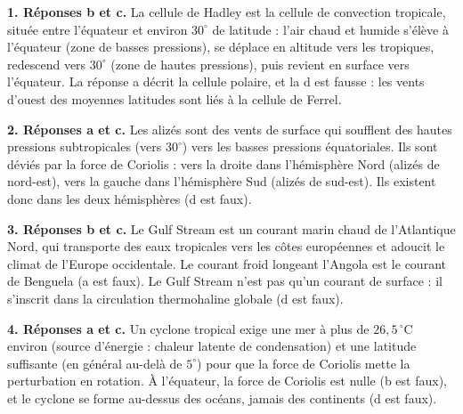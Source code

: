 \documentclass[11pt]{article}
\newcommand{\cle}[1]{{\popxbold\color{popdark}#1}}
\begin{document}
\begin{corrige}
\textbf{1. Réponses b et c.} La cellule de \cle{Hadley} est la cellule de convection tropicale, située entre l'équateur et environ $30^\circ$ de latitude : l'air chaud et humide s'élève à l'équateur (zone de basses pressions), se déplace en altitude vers les tropiques, redescend vers $30^\circ$ (zone de hautes pressions), puis revient en surface vers l'équateur. La réponse a décrit la cellule polaire, et la d est fausse : les vents d'ouest des moyennes latitudes sont liés à la cellule de Ferrel.

\textbf{2. Réponses a et c.} Les \cle{alizés} sont des vents de surface qui soufflent des hautes pressions subtropicales (vers $30^\circ$) vers les basses pressions équatoriales. Ils sont déviés par la \cle{force de Coriolis} : vers la droite dans l'hémisphère Nord (alizés de nord-est), vers la gauche dans l'hémisphère Sud (alizés de sud-est). Ils existent donc dans les deux hémisphères (d est faux).

\textbf{3. Réponses b et c.} Le \cle{Gulf Stream} est un courant marin chaud de l'Atlantique Nord, qui transporte des eaux tropicales vers les côtes européennes et adoucit le climat de l'Europe occidentale. Le courant froid longeant l'Angola est le courant de Benguela (a est faux). Le Gulf Stream n'est pas qu'un courant de surface : il s'inscrit dans la circulation thermohaline globale (d est faux).

\textbf{4. Réponses a et c.} Un cyclone tropical exige une mer à plus de $26,5\,^\circ$C environ (source d'énergie : chaleur latente de condensation) et une latitude suffisante (en général au-delà de $5^\circ$) pour que la force de Coriolis mette la perturbation en rotation. À l'équateur, la force de Coriolis est nulle (b est faux), et le cyclone se forme au-dessus des océans, jamais des continents (d est faux).
\end{corrige}
\end{document}
